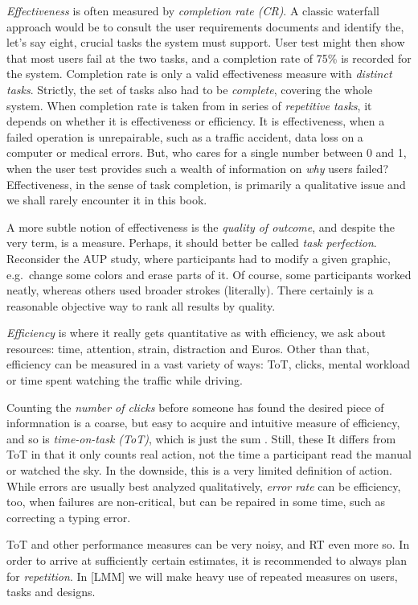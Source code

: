 \documentclass[]{svmono}
\theoremstyle{definition}
\theoremstyle{definition}
\theoremstyle{definition}
\theoremstyle{remark}
\begin{document}
\emph{Effectiveness} is often measured by \emph{completion rate (CR)}. A
classic waterfall approach would be to consult the user requirements
documents and identify the, let's say eight, crucial tasks the system
must support. User test might then show that most users fail at the two
tasks, and a completion rate of 75\% is recorded for the system.
Completion rate is only a valid effectiveness measure with
\emph{distinct tasks}. Strictly, the set of tasks also had to be
\emph{complete}, covering the whole system. When completion rate is
taken from in series of \emph{repetitive tasks}, it depends on whether
it is effectiveness or efficiency. It is effectiveness, when a failed
operation is unrepairable, such as a traffic accident, data loss on a
computer or medical errors. But, who cares for a single number between 0
and 1, when the user test provides such a wealth of information on
\emph{why} users failed? Effectiveness, in the sense of task completion,
is primarily a qualitative issue and we shall rarely encounter it in
this book.

A more subtle notion of effectiveness is the \emph{quality of outcome},
and despite the very term, is a measure. Perhaps, it should better be
called \emph{task perfection}. Reconsider the AUP study, where
participants had to modify a given graphic, e.g.~change some colors and
erase parts of it. Of course, some participants worked neatly, whereas
others used broader strokes (literally). There certainly is a reasonable
objective way to rank all results by quality.

\emph{Efficiency} is where it really gets quantitative as with
efficiency, we ask about resources: time, attention, strain, distraction
and Euros. Other than that, efficiency can be measured in a vast variety
of ways: ToT, clicks, mental workload or time spent watching the traffic
while driving.

Counting the \emph{number of clicks} before someone has found the
desired piece of informnation is a coarse, but easy to acquire and
intuitive measure of efficiency, and so is \emph{time-on-task (ToT)},
which is just the sum . Still, these It differs from ToT in that it only
counts real action, not the time a participant read the manual or
watched the sky. In the downside, this is a very limited definition of
action. While errors are usually best analyzed qualitatively,
\emph{error rate} can be efficiency, too, when failures are
non-critical, but can be repaired in some time, such as correcting a
typing error.

ToT and other performance measures can be very noisy, and RT even more
so. In order to arrive at sufficiently certain estimates, it is
recommended to always plan for \emph{repetition}. In {[}LMM{]} we will
make heavy use of repeated measures on users, tasks and designs.
\end{document}
